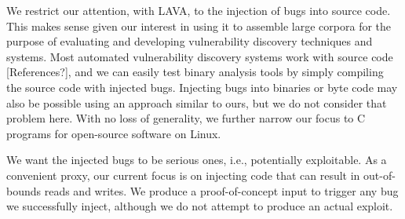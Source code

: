 
We restrict our attention, with LAVA, to the injection of bugs into source code.
This makes sense given our interest in using it to assemble large corpora for the purpose of evaluating and developing vulnerability discovery techniques and systems.
Most automated vulnerability discovery systems work with source code [References?], and we can easily test binary analysis tools by simply compiling the source code with injected bugs.
Injecting bugs into binaries or byte code may also be possible using an approach similar to ours, but we do not consider that problem here.
With no loss of generality, we further narrow our focus to C programs for open-source software on Linux. 

We want the injected bugs to be serious ones, i.e., potentially exploitable.
As a convenient proxy, our current focus is on injecting code that can result in out-of-bounds reads and writes.  
We produce a proof-of-concept input to trigger any bug we successfully inject, although we do not attempt to produce an actual exploit.

